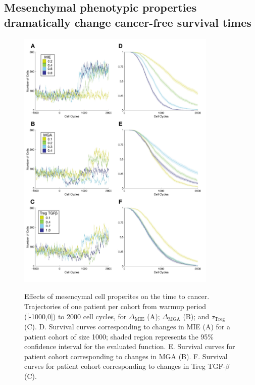 \documentclass[11pt]{article}
\begin{document}
\subsection{Mesenchymal phenotypic properties dramatically change cancer-free survival times}\label{MesPars}

\begin{figure}
\center
{\includegraphics[width=0.85\textwidth]{Figure3/Figure3.pdf}}
\caption{Effects of mesencymal cell properites on the time to cancer. Trajectories of one patient per cohort from warmup period ([-1000,0]) to 2000 cell cycles, for $\Delta_\text{MIE}$ (A); $\Delta_\text{MGA}$ (B); and $\tau_\text{Treg}$ (C). 
D. Survival curves corresponding to changes in MIE (A) for a patient cohort of size 1000; shaded region represents the 95\% confidence interval for the evaluated function. 
E. Survival curves for patient cohort corresponding to changes in MGA (B).
F. Survival curves for patient cohort corresponding to changes in Treg TGF-$\beta$ (C). 
}
\label{fig:FirstSurvivalCurves}
\end{figure}
\end{document}
